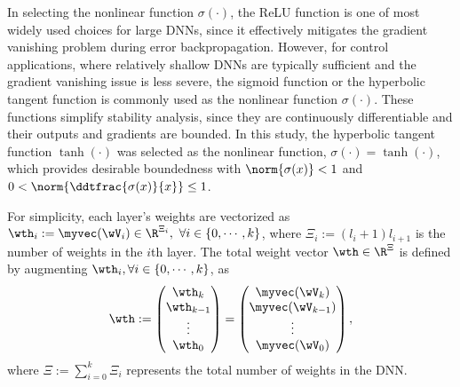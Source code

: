 \documentclass[letterpaper, journal]{IEEEtran}
\providecommand{\DIFadd}[1]{{\protect\color{blue}\uwave{#1}}} %
\providecommand{\DIFaddbegin}{} %
\providecommand{\DIFaddend}{} %
\begin{document}
    In selecting the nonlinear function $\sigma(\cdot)$, the ReLU function \cite{Maas:2013aa} is one of \DIFaddbegin \DIFadd{the }\DIFaddend most widely used choices for large DNNs, since it effectively mitigates the gradient vanishing problem during error backpropagation. 
    However, for control applications, where relatively shallow DNNs are typically sufficient and the gradient vanishing issue is less severe, the sigmoid function or the hyperbolic tangent function is commonly used as the nonlinear function $\sigma(\cdot)$. 
    These functions simplify stability analysis, since they are continuously differentiable and their outputs and gradients are bounded. 
In this study, the hyperbolic tangent function $\tanh(\cdot)$ was selected as the nonlinear function, \ie $\sigma(\cdot) = \tanh(\cdot)$, which provides desirable boundedness with $\norm{\sigma(x)}<1$ and $0<\norm{\ddtfrac{\sigma(x)}{x}}\le 1$.

For simplicity, each layer's weights are vectorized as $\wth_i:=\myvec(\wV_i)\in\R^{\Xi_i},\ \forall i\in\{0,\cdots,k\}$, where $\Xi_i:= (l_i+1)l_{i+1}$ is the number of weights in the $i$th layer. 
The total weight vector $\wth\in\R^{\Xi}$ is defined by augmenting $\wth_i, \forall i\in \{0,\cdots,k\}$, as 
\begin{equation}
    \wth := 
    \begin{pmatrix}
        \wth_k\\
        \wth_{k-1}\\
        \vdots\\
        \wth_0
    \end{pmatrix}
    =
    \begin{pmatrix}
        \myvec(\wV_k)\\
        \myvec(\wV_{k-1})\\
        \vdots\\
        \myvec(\wV_0)
    \end{pmatrix},
\end{equation}
where $\Xi:={\sum_{i=0}^{k} \Xi_i}$ represents the total number of weights in the DNN.
\end{document}
